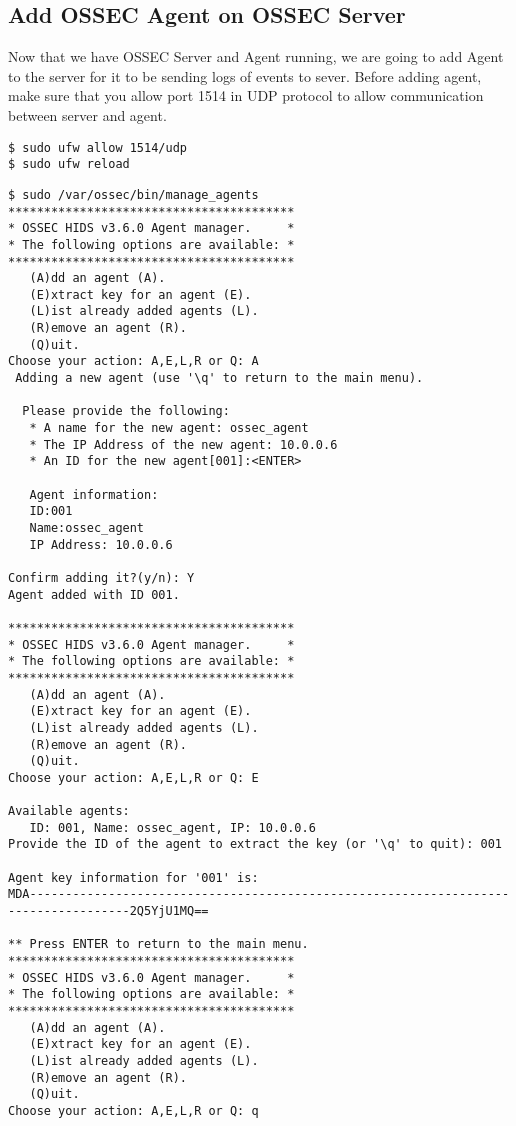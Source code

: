\documentclass{article}
\begin{document}
\subsection{Add OSSEC Agent on OSSEC Server}
Now that we have OSSEC Server and Agent running, we are going to add Agent to the server for it to be sending logs of events to sever. Before adding agent, make sure that you allow port 1514 in UDP protocol to allow communication between server and agent.
\begin{verbatim}
$ sudo ufw allow 1514/udp
$ sudo ufw reload
\end{verbatim}
\begin{verbatim}
$ sudo /var/ossec/bin/manage_agents
****************************************
* OSSEC HIDS v3.6.0 Agent manager.     *
* The following options are available: *
****************************************
   (A)dd an agent (A).
   (E)xtract key for an agent (E).
   (L)ist already added agents (L).
   (R)emove an agent (R).
   (Q)uit.
Choose your action: A,E,L,R or Q: A
 Adding a new agent (use '\q' to return to the main menu).

  Please provide the following:
   * A name for the new agent: ossec_agent
   * The IP Address of the new agent: 10.0.0.6
   * An ID for the new agent[001]:<ENTER>

   Agent information:
   ID:001
   Name:ossec_agent
   IP Address: 10.0.0.6

Confirm adding it?(y/n): Y
Agent added with ID 001.

****************************************
* OSSEC HIDS v3.6.0 Agent manager.     *
* The following options are available: *
****************************************
   (A)dd an agent (A).
   (E)xtract key for an agent (E).
   (L)ist already added agents (L).
   (R)emove an agent (R).
   (Q)uit.
Choose your action: A,E,L,R or Q: E

Available agents:
   ID: 001, Name: ossec_agent, IP: 10.0.0.6
Provide the ID of the agent to extract the key (or '\q' to quit): 001

Agent key information for '001' is:
MDA------------------------------------------------------------------------------------2Q5YjU1MQ==

** Press ENTER to return to the main menu.
****************************************
* OSSEC HIDS v3.6.0 Agent manager.     *
* The following options are available: *
****************************************
   (A)dd an agent (A).
   (E)xtract key for an agent (E).
   (L)ist already added agents (L).
   (R)emove an agent (R).
   (Q)uit.
Choose your action: A,E,L,R or Q: q


\end{verbatim}
\end{document}
